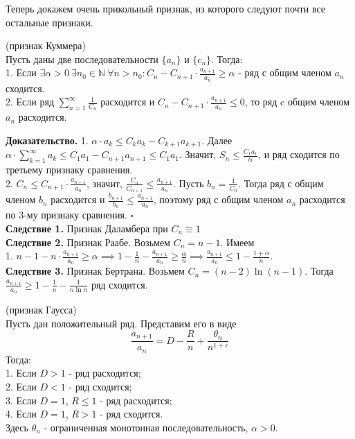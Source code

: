Теперь докажем очень прикольный признак, из которого следуют почти все 
остальные признаки. 
\begin{theor}
    (признак Куммера)\\
    Пусть даны две последовательности $\{a_n\}$ и  $\{c_n\}$. Тогда:\\
    1. Если $\exists \alpha>0~\exists n_0\in\mathbb{N}~\forall n>n_0:
    C_n-C_{n+1}\cdot \frac{a_{n+1}}{a_n}\geqslant\alpha$ - ряд с общим членом
    $a_n$ сходится.\\
    2. Если ряд $\sum\limits_{n=1}^{\infty} \frac{1}{C_n}$ расходится 
    и $C_n-C_{n+1}\cdot\frac{a_{n+1}}{a_n}\leqslant 0$, то ряд c общим
    членом $a_n$ расходится.
\end{theor}
\textbf{Доказательство.} %
1. $\alpha\cdot a_k\leqslant C_ka_k-C_{k+1}a_{k+1}$. Далее 
$\alpha\cdot \sum\limits_{k=1}^{\infty} a_k\leqslant C_1a_1-C_{n+1}a_{n+1}
\leqslant C_1a_1$. Значит, $S_n\leqslant \frac{C_1a_1}{\alpha}$, и ряд
сходится по третьему признаку сравнения.\\
2. $C_n\leqslant C_{n+1}\cdot \frac{a_{n+1}}{a_n}$, значит,
$\frac{C_n}{C_{n+1}}\leqslant \frac{a_{n+1}}{a_n}$. Пусть $b_n=\frac{1}{C_n}$.
Тогда ряд с общим членом $b_n$ расходится и $\frac{b_{n+1}}{b_n}\leqslant 
\frac{a_{n+1}}{a_n}$, поэтому ряд с общим членом $a_n$ расходится по 3-му
признаку сравнения. $\square$ \\
\textbf{Следствие 1.} Признак Даламбера при $C_n\equiv1$\\
\textbf{Следствие 2.} Признак Раабе. Возьмем $C_n=n-1$. Имеем\\ 
1. $n-1-n\cdot \frac{a_{n+1}}{a_n}\geqslant\alpha\implies1-\frac{1}{n}
-\frac{a_{n+1}}{a_n}\geqslant\frac{\alpha}{n}\implies\frac{a_{n+1}}{a_n}
\leqslant 1-\frac{1+\alpha}{n}$.\\
\textbf{Следствие 3.} Признак Бертрана. Возьмем $C_n=(n-2)\ln(n-1)$. 
Тогда $\frac{a_{n+1}}{a_n}\geqslant1-\frac{1}{n}-\frac{1}{n\ln{n}}$
ряд сходится.
\begin{theor}
    (признак Гаусса)\\
    Пусть дан положительный ряд. Представим его в виде
    $$\frac{a_{n+1}}{a_n}=D-\frac{R}{n}+ \frac{\theta_n}{n^{1+\varepsilon}}$$ 
    Тогда:\\
    1. Если $D>1$ - ряд расходится;\\
    2. Если $D<1$ - ряд сходится;\\
    3. Если $D=1$,  $R\leqslant 1$ - ряд расходится;\\
    4. Если $D=1$,  $R>1$ - ряд сходится.\\
    Здесь $\theta_n$ - ограниченная монотонная последовательность,
     $\alpha>0$.
\end{theor}
